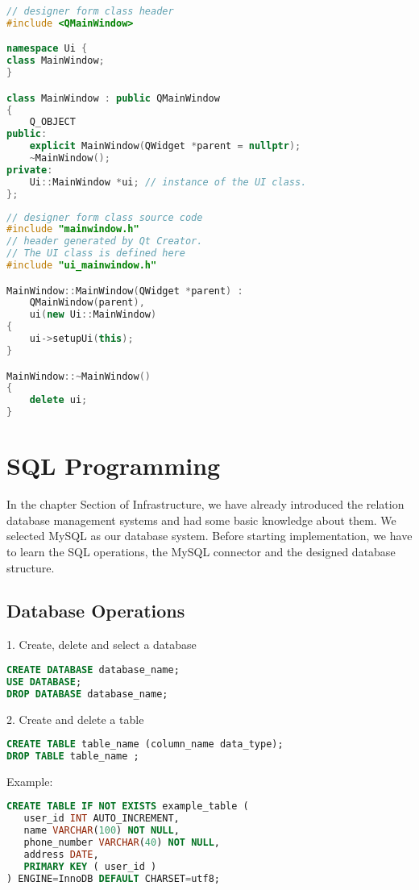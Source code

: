 \begin{lstlisting}[language=C++]
// designer form class header  
#include <QMainWindow>

namespace Ui {
class MainWindow;
}

class MainWindow : public QMainWindow
{
    Q_OBJECT
public:
    explicit MainWindow(QWidget *parent = nullptr);
    ~MainWindow();
private:
    Ui::MainWindow *ui; // instance of the UI class.
};
\end{lstlisting}

\begin{lstlisting}[language=C++]
// designer form class source code  
#include "mainwindow.h"
// header generated by Qt Creator.
// The UI class is defined here
#include "ui_mainwindow.h"  

MainWindow::MainWindow(QWidget *parent) :
    QMainWindow(parent),
    ui(new Ui::MainWindow)
{
    ui->setupUi(this);
}

MainWindow::~MainWindow()
{
    delete ui;
}
\end{lstlisting}

\section{SQL Programming}
In the chapter Section of Infrastructure, we have already introduced the relation database management systems and had some basic knowledge about them. We selected MySQL as our database system. Before starting implementation, we have to learn the SQL operations, the MySQL connector and the designed database structure.

\subsection{Database Operations}
1. Create, delete and select a database
\begin{lstlisting}[language=SQL]
CREATE DATABASE database_name;
USE DATABASE;
DROP DATABASE database_name;
\end{lstlisting}

2. Create and delete a table
\begin{lstlisting}[language=SQL]
CREATE TABLE table_name (column_name data_type);
DROP TABLE table_name ;
\end{lstlisting}

Example:
\begin{lstlisting}[language=SQL]
CREATE TABLE IF NOT EXISTS example_table (
   user_id INT AUTO_INCREMENT,
   name VARCHAR(100) NOT NULL,
   phone_number VARCHAR(40) NOT NULL,
   address DATE,
   PRIMARY KEY ( user_id )
) ENGINE=InnoDB DEFAULT CHARSET=utf8;
\end{lstlisting}

